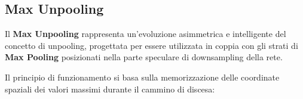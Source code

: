 ﻿\documentclass[11pt, a4paper]{article}
\begin{document}
\newpage

\subsection{Max Unpooling}

Il \textbf{Max Unpooling} rappresenta un'evoluzione asimmetrica e intelligente del concetto di unpooling, progettata per essere utilizzata in coppia con gli strati di \textbf{Max Pooling} posizionati nella parte speculare di downsampling della rete.


Il principio di funzionamento si basa sulla memorizzazione delle coordinate spaziali dei valori massimi durante il cammino di discesa:
\end{document}
